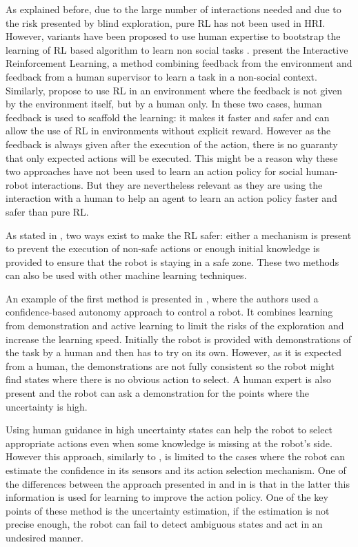     As explained before, due to the large number of interactions needed and due
    to the risk presented by blind exploration, pure RL has not been used in
    HRI. However, variants have been proposed to use human expertise to
    bootstrap the learning of RL based algorithm to learn non social tasks
    \citep{kober2013reinforcement}. \citet{thomaz2008teachable} present the
    Interactive Reinforcement Learning, a method combining feedback from the
    environment and feedback from a human supervisor to learn a task in a
    non-social context. Similarly, \citet{knox2009interactively} propose to use
    RL in an environment where the feedback is not given by the environment
    itself, but by a human only. In these two cases, human feedback is used to
    scaffold the learning: it makes it faster and safer and can allow the use of
    RL in environments without explicit reward. However as the feedback is
    always given after the execution of the action, there is no guaranty that
    only expected actions will be executed. This might be a reason why these two
    approaches have not been used to learn an action policy for social
    human-robot interactions. But they are nevertheless relevant as they are
    using the interaction with a human to help an agent to learn an action
    policy faster and safer than pure RL.

    As stated in \citet{garcia2015comprehensive}, two ways exist to make the RL
    safer: either a mechanism is present to prevent the execution of non-safe
    actions or enough initial knowledge is provided to ensure that the robot is
    staying in a safe zone. These two methods can also be used with other
    machine learning techniques. 

    An example of the first method is presented in \citet{chernova2009}, where
    the authors used a confidence-based autonomy approach to control a robot. It
    combines learning from demonstration and active learning
    \citep{johnson1991active} to limit the risks of the exploration and increase
    the learning speed. Initially the robot is provided with demonstrations of
    the task by a human and then has to try on its own. However, as it is
    expected from a human, the demonstrations are not fully consistent so the
    robot might find states where there is no obvious action to select. A human
    expert is also present and the robot can ask a demonstration for the points
    where the uncertainty is high. 

    Using human guidance in high uncertainty states can help the robot to select
    appropriate actions even when some knowledge is missing at the robot's side.
    However this approach, similarly to \citet{shiomi2008semi}, is limited to
    the cases where the robot can estimate the confidence in its sensors and its
    action selection mechanism. One of the differences between the approach
    presented in \citet{shiomi2008semi} and in \citet{chernova2009} is that in
    the latter this information is used for learning to improve the action
    policy. One of the key points of these method is the uncertainty estimation,
    if the estimation is not precise enough, the robot can fail to detect
    ambiguous states and act in an undesired manner.

